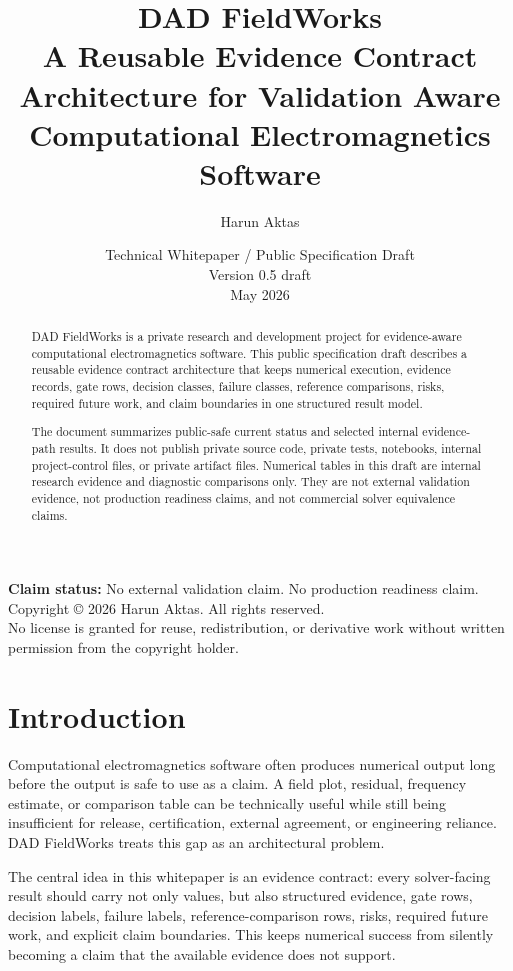 \documentclass[11pt,a4paper]{article}
\title{\textbf{DAD FieldWorks}\\
{\large A Reusable Evidence Contract Architecture for Validation Aware Computational Electromagnetics Software}}
\author{Harun Aktas}
\date{Technical Whitepaper / Public Specification Draft\\Version 0.5 draft\\May 2026}
\begin{document}
\maketitle

\begin{center}
\textbf{Claim status:} No external validation claim. No production readiness claim.\\
Copyright © 2026 Harun Aktas. All rights reserved.\\
No license is granted for reuse, redistribution, or derivative work without written permission from the copyright holder.
\end{center}

\newpage
\begin{abstract}
DAD FieldWorks is a private research and development project for evidence-aware computational electromagnetics software. This public specification draft describes a reusable evidence contract architecture that keeps numerical execution, evidence records, gate rows, decision classes, failure classes, reference comparisons, risks, required future work, and claim boundaries in one structured result model.

The document summarizes public-safe current status and selected internal evidence-path results. It does not publish private source code, private tests, notebooks, internal project-control files, or private artifact files. Numerical tables in this draft are internal research evidence and diagnostic comparisons only. They are not external validation evidence, not production readiness claims, and not commercial solver equivalence claims.
\end{abstract}

\tableofcontents
\newpage

\section{Introduction}
\label{sec:introduction}

Computational electromagnetics software often produces numerical output long before the output is safe to use as a claim. A field plot, residual, frequency estimate, or comparison table can be technically useful while still being insufficient for release, certification, external agreement, or engineering reliance. DAD FieldWorks treats this gap as an architectural problem.

The central idea in this whitepaper is an evidence contract: every solver-facing result should carry not only values, but also structured evidence, gate rows, decision labels, failure labels, reference-comparison rows, risks, required future work, and explicit claim boundaries. This keeps numerical success from silently becoming a claim that the available evidence does not support.
\end{document}
